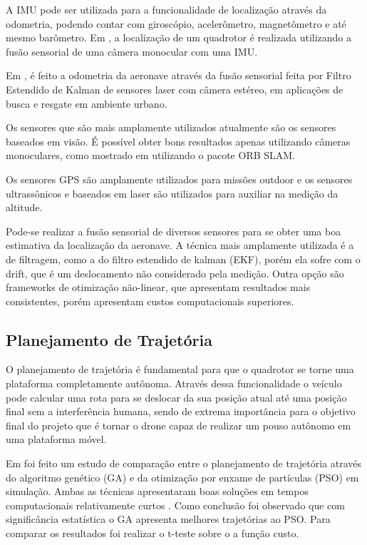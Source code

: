 A IMU pode ser utilizada para a funcionalidade de localização através da odometria, podendo contar com giroscópio, acelerômetro, magnetômetro e até mesmo barômetro. Em \cite{loianno2016estimation}, a localização de um quadrotor é realizada utilizando a fusão sensorial de uma câmera monocular com uma IMU.

Em \cite{tomic2012toward}, é feito a odometria da aeronave através da fusão sensorial feita por Filtro Estendido de Kalman de sensores laser com câmera estéreo, em aplicações de busca e resgate em ambiente urbano.

Os sensores que são mais amplamente utilizados atualmente são os sensores baseados em visão. É possível obter bons resultados apenas utilizando câmeras monoculares, como mostrado em \cite{mur2015orb} utilizando o pacote ORB SLAM.

Os sensores GPS são amplamente utilizados para missões outdoor e os sensores ultrassônicos e baseados em laser são utilizados para auxiliar na medição da altitude.

Pode-se realizar a fusão sensorial de diversos sensores para se obter uma boa estimativa da localização da aeronave. A técnica mais amplamente utilizada é a de filtragem, como a do filtro estendido de kalman (EKF), porém ela sofre com o drift, que é um deslocamento não considerado pela medição. Outra opção são frameworks de otimização não-linear, que apresentam resultados mais consistentes, porém apresentam custos computacionais superiores.

\subsection{Planejamento de Trajetória}
O planejamento de trajetória é fundamental para que o quadrotor se torne uma plataforma completamente autônoma. Através dessa funcionalidade o veículo pode calcular uma rota para se deslocar da sua posição atual até uma posição final sem a interferência humana, sendo de extrema importância para o objetivo final do projeto que é tornar o drone capaz de realizar um pouso autônomo em uma plataforma móvel.


Em \cite{Roberge2013b} foi feito um estudo de comparação entre o planejamento de trajetória através do algoritmo genético (GA) e da otimização por enxame de partículas (PSO) em simulação. Ambas as técnicas apresentaram boas soluções em tempos computacionais relativamente curtos . Como conclusão foi observado que com significância estatística o GA apresenta melhores trajetórias ao PSO. Para comparar os resultados foi realizar o t-teste sobre o a função custo.

